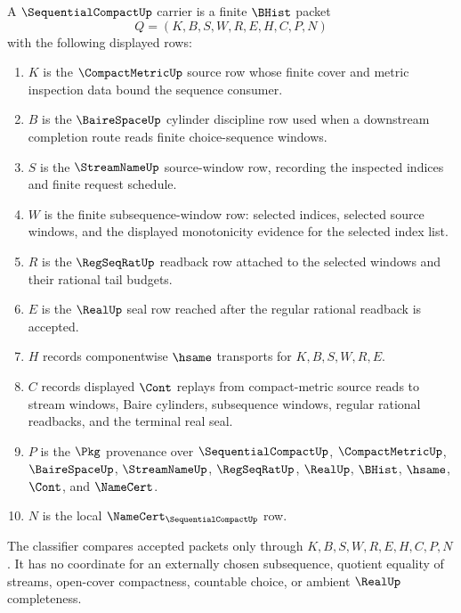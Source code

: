 \begin{definition}
\label{def:sequential-compact-carrier}
A $\SequentialCompactUp$ carrier is a finite $\BHist$ packet
$$
Q=(K,B,S,W,R,E,H,C,P,N)
$$
with the following displayed rows:
\begin{enumerate}
\item $K$ is the $\CompactMetricUp$ source row whose finite cover and metric inspection data bound the sequence consumer.
\item $B$ is the $\BaireSpaceUp$ cylinder discipline row used when a downstream completion route reads finite choice-sequence windows.
\item $S$ is the $\StreamNameUp$ source-window row, recording the inspected indices and finite request schedule.
\item $W$ is the finite subsequence-window row: selected indices, selected source windows, and the displayed monotonicity evidence for the selected index list.
\item $R$ is the $\RegSeqRatUp$ readback row attached to the selected windows and their rational tail budgets.
\item $E$ is the $\RealUp$ seal row reached after the regular rational readback is accepted.
\item $H$ records componentwise $\hsame$ transports for $K,B,S,W,R,E$.
\item $C$ records displayed $\Cont$ replays from compact-metric source reads to stream windows, Baire cylinders, subsequence windows, regular rational readbacks, and the terminal real seal.
\item $P$ is the $\Pkg$ provenance over $\SequentialCompactUp$, $\CompactMetricUp$, $\BaireSpaceUp$, $\StreamNameUp$, $\RegSeqRatUp$, $\RealUp$, $\BHist$, $\hsame$, $\Cont$, and $\NameCert$.
\item $N$ is the local $\NameCert_{\SequentialCompactUp}$ row.
\end{enumerate}
The classifier compares accepted packets only through $K,B,S,W,R,E,H,C,P,N$. It has no coordinate for an externally chosen subsequence, quotient equality of streams, open-cover compactness, countable choice, or ambient $\RealUp$ completeness.
\end{definition}


